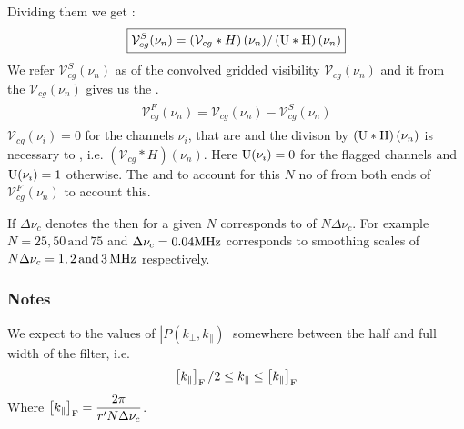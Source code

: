\documentclass[a4paper,11pt,oneside,english,openany]{sphinxmanual}
\begin{document}
\sphinxAtStartPar
Dividing them we get :
\begin{equation*}
\begin{split}\begin{align}
    \boxed{\mathcal{V}_{cg}^S(\nu_n) = \left(\mathcal{V}_{cg}\ast H\right)(\nu_n)/\left(\rm U\ast H\right)(\nu_n)}
\end{align}\end{split}
\end{equation*}
\sphinxAtStartPar
We refer \(\mathcal{V}_{cg}^S(\nu_n)\) as  of the convolved gridded visibility \(\mathcal{V}_{cg}(\nu_n)\) and  it from the \(\mathcal{V}_{cg}(\nu_n)\) gives us the .
\begin{equation*}
\begin{split}\begin{align}
    \boxed{\mathcal{V}_{cg}^F(\nu_n) = \mathcal{V}_{cg}(\nu_n) - \mathcal{V}_{cg}^S(\nu_n)}
\end{align}\end{split}
\end{equation*}
\sphinxAtStartPar
\(\mathcal{V}_{cg}(\nu_i) = 0\) for the channels \(\nu_i\), that are  and the divison by \(\left(\rm U\ast H\right)(\nu_n)\) is necessary to , i.e. \(\left(\mathcal{V}_{cg}\ast H\right)(\nu_n)\). Here \({\rm U}(\nu_i) = 0\) for the flagged channels and \({\rm U}(\nu_i) = 1\) otherwise. The  and to account for this \(N\) no of  from both ends of \(\mathcal{V}_{cg}^F(\nu_n)\) to account this.

\sphinxAtStartPar
If \(\Delta\nu_c\) denotes the  then for a given \(N\) corresponds to   of \(N\Delta\nu_c\). For example \(N = 25, 50\, \text{and}\, 75\) and \(\Delta\nu_c = 0.04 \rm MHz\) corresponds to smoothing scales of \(N\Delta\nu_c = 1, 2\, \text{and}\, 3\, \rm MHz\) respectively.
\subsubsection*{Notes}

\sphinxAtStartPar
We expect  to  the values of \(|P(k_\perp,k_\parallel)|\) somewhere between the half and full width of the filter, i.e.
\begin{equation*}
\begin{split}\left[k_{\parallel}\right]_{\rm F}/2 \leq k_\parallel \leq \left[k_{\parallel}\right]_{\rm F}\end{split}
\end{equation*}
\sphinxAtStartPar
Where \(\left[k_{\parallel}\right]_{\rm F} = \dfrac{2\pi}{r'N\Delta\nu_c}\).
\end{document}
